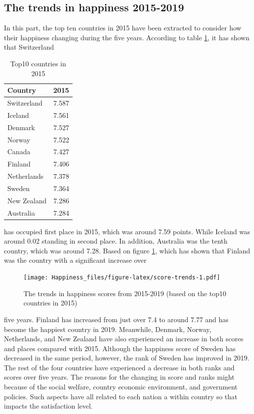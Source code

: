 \documentclass[11pt,a4paper,]{article}
\begin{document}
\hypertarget{the-trends-in-happiness-2015-2019}{%
\subsection{The trends in happiness 2015-2019}\label{the-trends-in-happiness-2015-2019}}

In this part, the top ten countries in 2015 have been extracted to consider how their happiness changing during the five years. According to table \ref{tab:top10-countries-2015}, it has shown that Switzerland

\begin{table}

\caption{\label{tab:top10-countries-2015}Top10 countries in 2015}
\centering
\begin{tabular}[t]{l|r}
\hline
Country & 2015\\
\hline
Switzerland & 7.587\\
\hline
Iceland & 7.561\\
\hline
Denmark & 7.527\\
\hline
Norway & 7.522\\
\hline
Canada & 7.427\\
\hline
Finland & 7.406\\
\hline
Netherlands & 7.378\\
\hline
Sweden & 7.364\\
\hline
New Zealand & 7.286\\
\hline
Australia & 7.284\\
\hline
\end{tabular}
\end{table}

has occupied first place in 2015, which was around 7.59 points. While Iceland was around 0.02 standing in second place. In addition, Australia was the tenth country, which was around 7.28. Based on figure \ref{fig:score-trends}, which has shown that Finland was the country with a significant increase over

\begin{figure}
\centering
\texttt{[image: Happiness\_files/figure-latex/score-trends-1.pdf]}
\caption{\label{fig:score-trends}The trends in happiness scores from 2015-2019 (based on the top10 countries in 2015)}
\end{figure}

five years. Finland has increased from just over 7.4 to around 7.77 and has become the happiest country in 2019. Meanwhile, Denmark, Norway, Netherlands, and New Zealand have also experienced an increase in both scores and places compared with 2015. Although the happiness score of Sweden has decreased in the same period, however, the rank of Sweden has improved in 2019. The rest of the four countries have experienced a decrease in both ranks and scores over five years. The reasons for the changing in score and ranks might because of the social welfare, country economic environment, and government policies. Such aspects have all related to each nation a within country so that impacts the satisfaction level.
\end{document}
